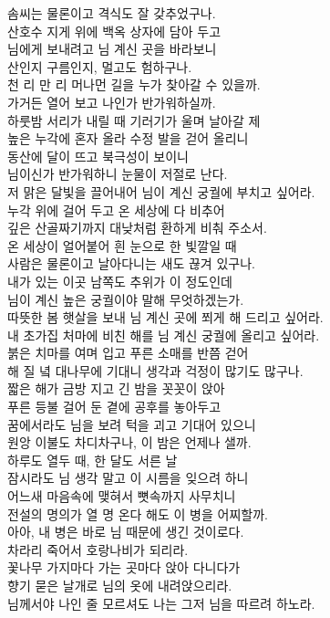 \documentclass[fs9,seriesRus]{korfarm-base}
\begin{document}
{솜씨는 물론이고 격식도 잘 갖추었구나. \\[4pt]
산호수 지게 위에 백옥 상자에 담아 두고 \\[4pt]
님에게 보내려고 님 계신 곳을 바라보니 \\[4pt]
산인지 구름인지, 멀고도 험하구나. \\[4pt]
천 리 만 리 머나먼 길을 누가 찾아갈 수 있을까. \\[4pt]
가거든 열어 보고 나인가 반가워하실까. \\[14pt]
하룻밤 서리가 내릴 때 기러기가 울며 날아갈 제 \\[4pt]
높은 누각에 혼자 올라 수정 발을 걷어 올리니 \\[4pt]
동산에 달이 뜨고 북극성이 보이니 \\[4pt]
님이신가 반가워하니 눈물이 저절로 난다. \\[4pt]
저 맑은 달빛을 끌어내어 님이 계신 궁궐에 부치고 싶어라. \\[4pt]
누각 위에 걸어 두고 온 세상에 다 비추어 \\[4pt]
깊은 산골짜기까지 대낮처럼 환하게 비춰 주소서. \\[14pt]
온 세상이 얼어붙어 흰 눈으로 한 빛깔일 때 \\[4pt]
사람은 물론이고 날아다니는 새도 끊겨 있구나. \\[4pt]
내가 있는 이곳 남쪽도 추위가 이 정도인데 \\[4pt]
님이 계신 높은 궁궐이야 말해 무엇하겠는가. \\[4pt]
따뜻한 봄 햇살을 보내 님 계신 곳에 쬐게 해 드리고 싶어라. \\[4pt]
내 초가집 처마에 비친 해를 님 계신 궁궐에 올리고 싶어라. \\[4pt]
붉은 치마를 여며 입고 푸른 소매를 반쯤 걷어 \\[4pt]
해 질 녘 대나무에 기대니 생각과 걱정이 많기도 많구나. \\[4pt]
짧은 해가 금방 지고 긴 밤을 꼿꼿이 앉아 \\[4pt]
푸른 등불 걸어 둔 곁에 공후를 놓아두고 \\[4pt]
꿈에서라도 님을 보려 턱을 괴고 기대어 있으니 \\[4pt]
원앙 이불도 차디차구나, 이 밤은 언제나 샐까. \\[14pt]
하루도 열두 때, 한 달도 서른 날 \\[4pt]
잠시라도 님 생각 말고 이 시름을 잊으려 하니 \\[4pt]
어느새 마음속에 맺혀서 뼛속까지 사무치니 \\[4pt]
전설의 명의가 열 명 온다 해도 이 병을 어찌할까. \\[4pt]
아아, 내 병은 바로 님 때문에 생긴 것이로다. \\[4pt]
차라리 죽어서 호랑나비가 되리라. \\[4pt]
꽃나무 가지마다 가는 곳마다 앉아 다니다가 \\[4pt]
향기 묻은 날개로 님의 옷에 내려앉으리라. \\[4pt]
님께서야 나인 줄 모르셔도 나는 그저 님을 따르려 하노라.
}
\end{document}

